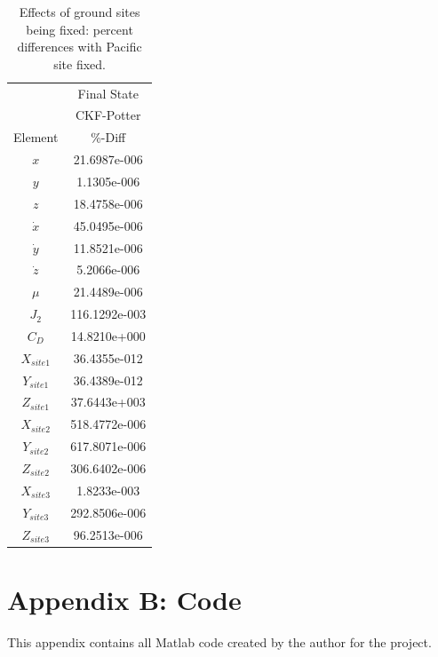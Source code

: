 \documentclass[]{aiaa-tc}%
\begin{document}
	\begin{table}[H]%
		\begin{center}
			\caption{Effects of ground sites being fixed: percent differences with Pacific site fixed.}
			\label{t:Potter_results}
			\begin{tabular}{c|c}
\hline & Final State  \\
 &CKF-Potter \\ 
Element & \%-Diff  \\ \hline
$x$         &     21.6987e-006 \\
$y$         &      1.1305e-006 \\
$z$         &     18.4758e-006 \\
$\dot{x}$   &     45.0495e-006 \\
$\dot{y}$   &     11.8521e-006 \\
$\dot{z}$   &      5.2066e-006 \\
$\mu$       &     21.4489e-006 \\
$J_2$       &    116.1292e-003 \\
$C_D$       &     14.8210e+000 \\
$X_{site1}$ &     36.4355e-012 \\
$Y_{site1}$ &     36.4389e-012 \\
$Z_{site1}$ &     37.6443e+003 \\
$X_{site2}$ &    518.4772e-006 \\
$Y_{site2}$ &    617.8071e-006 \\
$Z_{site2}$ &    306.6402e-006 \\
$X_{site3}$ &      1.8233e-003 \\
$Y_{site3}$ &    292.8506e-006 \\
$Z_{site3}$ &     96.2513e-006 \\

			\end{tabular}
		\end{center}
	\end{table}  
	

	\newpage

	\section{Appendix B: Code}

This appendix contains all Matlab code created by the author for the project.
\end{document}
